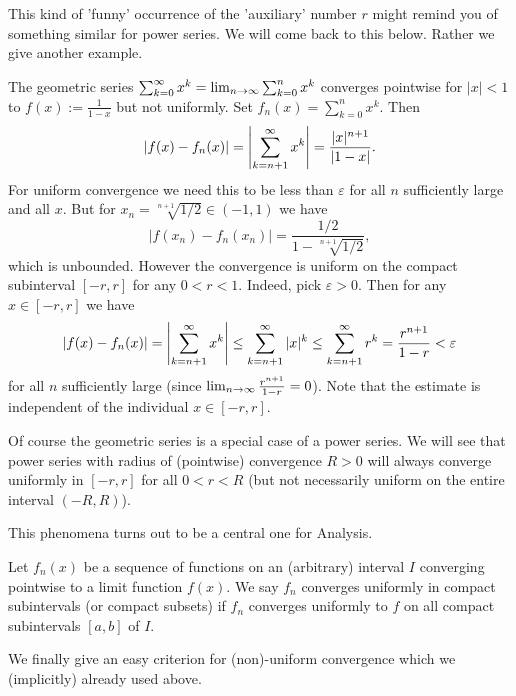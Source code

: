 \documentclass[10pt, a4paper]{article}
\newcommand{\infsumo}{\infsum[k = 0]}
\begin{document}
This kind of 'funny' occurrence of the 'auxiliary' number $r$ might remind you of something similar for power series.
We will come back to this below.
Rather we give another example.

\begin{example}
    The geometric series $\infsumo x ^ k = \liminfty\sum_{k = 0}^{n}x ^ k$ converges pointwise for $|x| < 1$ to $f(x) := \frac{1}{1 - x}$ but not uniformly.
    Set $f_n(x) = \sum_{k = 0}^{n}x ^ k$.
    Then
    \[
    |f(x) - f_n(x)| = \left|\infsum[k = n + 1]x ^ k\right| = \frac{|x| ^ {n + 1}}{|1 - x|}.
    \]
    For uniform convergence we need this to be less than $\varepsilon$ for all $n$ sufficiently large and all $x$.
    But for $x_n = \sqrt[n + 1]{1 / 2} \in (-1, 1)$ we have
    \[
    |f(x_n) - f_n(x_n)| = \frac{1 / 2}{1 - \sqrt[n + 1]{1 / 2}},
    \]
    which is unbounded.
    However the convergence is uniform on the compact subinterval $[-r, r]$ for any $0 < r < 1$.
    Indeed,
    pick $\varepsilon > 0$.
    Then for any $x \in [-r, r]$ we have
    \[
    |f(x) - f_n(x)| = \left|\infsum[k = n + 1]x ^ k\right| \leq \infsum[k = n + 1]|x| ^ k \leq \infsum[k = n + 1]r ^ k = \frac{r ^ {n + 1}}{1 - r} < \varepsilon
    \]
    for all $n$ sufficiently large
    (since $\liminfty\frac{r ^ {n + 1}}{1 - r} = 0$).
    Note that the estimate is independent of the individual $x \in [-r, r]$.
\end{example}

Of course the geometric series is a special case of a power series.
We will see that power series with radius of
(pointwise)
convergence $R > 0$ will always converge uniformly in $[-r, r]$ for all $0 < r < R$
(but not necessarily uniform on the entire interval $(-R, R)$).

This phenomena turns out to be a central one for Analysis.

\begin{definition}
    Let $f_n(x)$ be a sequence of functions on an
    (arbitrary)
    interval $I$ converging pointwise to a limit function $f(x)$.
    We say $f_n$ converges uniformly in compact subintervals
    (or compact subsets)
    if $f_n$ converges uniformly to $f$ on all compact subintervals $[a, b]$ of $I$.
\end{definition}

We finally give an easy criterion for
(non)-uniform convergence which we
(implicitly)
already used above.
\end{document}
